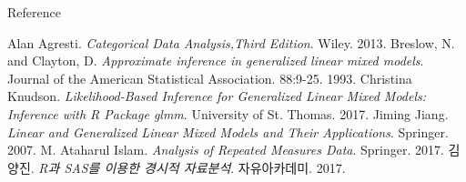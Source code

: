 \documentclass[9pt, xelatex]{beamer}
\begin{document}
\begin{frame}{Reference}
	\begin{thebibliography}{9}
		Alan Agresti. 
		\textit{Categorical Data Analysis,Third Edition}. 
		Wiley. 2013.
		Breslow, N. and Clayton, D.
		\textit{Approximate inference in generalized linear mixed models}. 
		Journal of the American Statistical Association. 88:9-25. 1993.
		Christina Knudson. 
		\textit{Likelihood-Based Inference for Generalized Linear Mixed Models: Inference with R Package glmm}. 
		University of St. Thomas. 2017.
		Jiming Jiang. 
		\textit{Linear and Generalized Linear Mixed Models and Their Applications}. 
		Springer. 2007.
		M. Ataharul Islam.
		\textit{Analysis of Repeated Measures Data}. 
		Springer. 2017.
		김양진.
		\textit{R과 SAS를 이용한 경시적 자료분석}. 
		자유아카데미. 2017.
	\end{thebibliography}
\end{frame}
\label{key}
\end{document}
